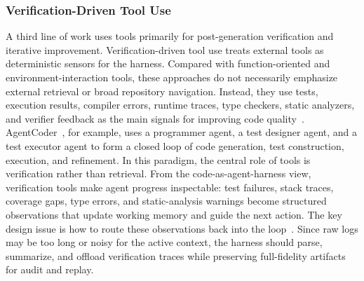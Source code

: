 \subsubsection{Verification-Driven Tool Use}
A third line of work uses tools primarily for post-generation verification and iterative improvement. Verification-driven tool use treats external tools as deterministic sensors for the harness. Compared with function-oriented and environment-interaction tools, these approaches do not necessarily emphasize external retrieval or broad repository navigation. Instead, they use tests, execution results, compiler errors, runtime traces, type checkers, static analyzers, and verifier feedback as the main signals for improving code quality~\cite{miculicich2025veriguard,liu2026agents4plc,liu2026llm,jin2025reveal}. AgentCoder~\cite{huang2023agentcoder}, for example, uses a programmer agent, a test designer agent, and a test executor agent to form a closed loop of code generation, test construction, execution, and refinement. In this paradigm, the central role of tools is verification rather than retrieval. From the code-as-agent-harness view, verification tools make agent progress inspectable: test failures, stack traces, coverage gaps, type errors, and static-analysis warnings become structured observations that update working memory and guide the next action. The key design issue is how to route these observations back into the loop~\cite{miculicich2025veriguard}. Since raw logs may be too long or noisy for the active context, the harness should parse, summarize, and offload verification traces while preserving full-fidelity artifacts for audit and replay.

